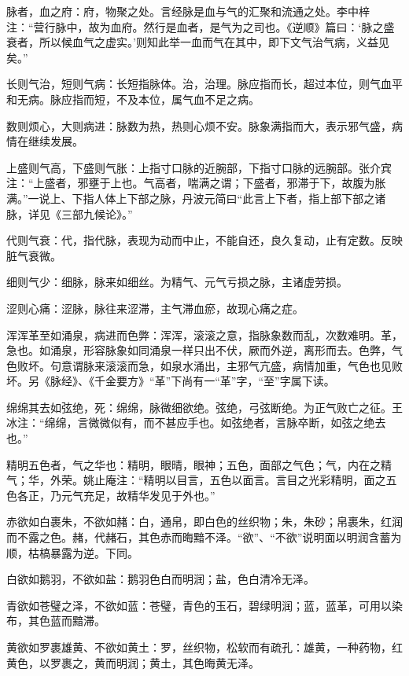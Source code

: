 \documentclass[12pt]{ctexbook}
\begin{document}
\begin{jiaozhu}
	\item 脉者，血之府：府，物聚之处。言经脉是血与气的汇聚和流通之处。李中梓注：“营行脉中，故为血府。然行是血者，是气为之司也。《逆顺》篇曰：‘脉之盛衰者，所以候血气之虚实。’则知此举一血而气在其中，即下文气治气病，义益见矣。”
	\item 长则气治，短则气病：长短指脉体。治，治理。脉应指而长，超过本位，则气血平和无病。脉应指而短，不及本位，属气血不足之病。
	\item 数则烦心，大则病进：脉数为热，热则心烦不安。脉象满指而大，表示邪气盛，病情在继续发展。
	\item 上盛则气高，下盛则气胀：上指寸口脉的近腕部，下指寸口脉的远腕部。张介宾注：“上盛者，邪壅于上也。气高者，喘满之谓；下盛者，邪滞于下，故腹为胀满。”一说上、下指人体上下部之脉，丹波元简曰“此言上下者，指上部下部之诸脉，详见《三部九候论》。”
	\item 代则气衰：代，指代脉，表现为动而中止，不能自还，良久复动，止有定数。反映脏气衰微。
	\item 细则气少：细脉，脉来如细丝。为精气、元气亏损之脉，主诸虚劳损。
	\item 涩则心痛：涩脉，脉往来涩滞，主气滞血瘀，故现心痛之症。
	\item 浑浑革至如涌泉，病进而色弊：浑浑，滚滚之意，指脉象数而乱，次数难明。革，急也。如涌泉，形容脉象如同涌泉一样只出不伏，厥而外逆，离形而去。色弊，气色败坏。句意谓脉来滚滚而急，如泉水涌出，主邪气亢盛，病情加重，气色也见败坏。另《脉经》、《千金要方》“革”下尚有一“革”字，“至”字属下读。
	\item 绵绵其去如弦绝，死：绵绵，脉微细欲绝。弦绝，弓弦断绝。为正气败亡之征。王冰注：“绵绵，言微微似有，而不甚应手也。如弦绝者，言脉卒断，如弦之绝去也。”
	\item 精明五色者，气之华也：精明，眼晴，眼神；五色，面部之气色；气，内在之精气；华，外荣。姚止庵注：“精明以目言，五色以面言。言目之光彩精明，面之五色各正，乃元气充足，故精华发见于外也。”
	\item 赤欲如白裹朱，不欲如赭：白，通帛，即白色的丝织物；朱，朱砂；帛裹朱，红润而不露之色。赭，代赭石，其色赤而晦黯不泽。“欲”、“不欲”说明面以明润含蓄为顺，枯槁暴露为逆。下同。
	\item 白欲如鹅羽，不欲如盐：鹅羽色白而明润；盐，色白清冷无泽。
	\item 青欲如苍璧之泽，不欲如蓝：苍璧，青色的玉石，碧绿明润；蓝，蓝革，可用以染布，其色蓝而黯滞。
	\item 黄欲如罗裹雄黄、不欲如黄土：罗，丝织物，松软而有疏孔：雄黄，一种药物，红黄色，以罗裹之，黄而明润；黄土，其色晦黄无泽。

\end{jiaozhu}
\end{document}
